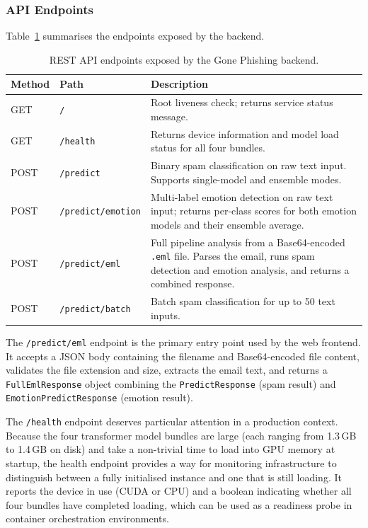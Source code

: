 \subsubsection{API Endpoints}

Table~\ref{tab:api_endpoints} summarises the endpoints exposed by the backend.

\begin{table}[htbp]
\centering
\caption{REST API endpoints exposed by the Gone Phishing backend.}
\label{tab:api_endpoints}
\begin{tabular}{llp{6.5cm}}
\hline
\textbf{Method} & \textbf{Path} & \textbf{Description} \\
\hline
GET  & \texttt{/}                & Root liveness check; returns service status message. \\
GET  & \texttt{/health}          & Returns device information and model load status for all four bundles. \\
POST & \texttt{/predict}         & Binary spam classification on raw text input. Supports single-model and ensemble modes. \\
POST & \texttt{/predict/emotion} & Multi-label emotion detection on raw text input; returns per-class scores for both emotion models and their ensemble average. \\
POST & \texttt{/predict/eml}     & Full pipeline analysis from a Base64-encoded \texttt{.eml} file. Parses the email, runs spam detection and emotion analysis, and returns a combined response. \\
POST & \texttt{/predict/batch}   & Batch spam classification for up to 50 text inputs. \\
\hline
\end{tabular}
\end{table}

The \texttt{/predict/eml} endpoint is the primary entry point used by the web frontend. It accepts a \ac{JSON} body containing the filename and Base64-encoded file content, validates the file extension and size, extracts the email text, and returns a \texttt{FullEmlResponse} object combining the \texttt{PredictResponse} (spam result) and \texttt{EmotionPredictResponse} (emotion result).

The \texttt{/health} endpoint deserves particular attention in a production context. Because the four transformer model bundles are large (each ranging from 1.3\,GB to 1.4\,GB on disk) and take a non-trivial time to load into \ac{GPU} memory at startup, the health endpoint provides a way for monitoring infrastructure to distinguish between a fully initialised instance and one that is still loading. It reports the device in use (CUDA or CPU) and a boolean indicating whether all four bundles have completed loading, which can be used as a readiness probe in container orchestration environments.

